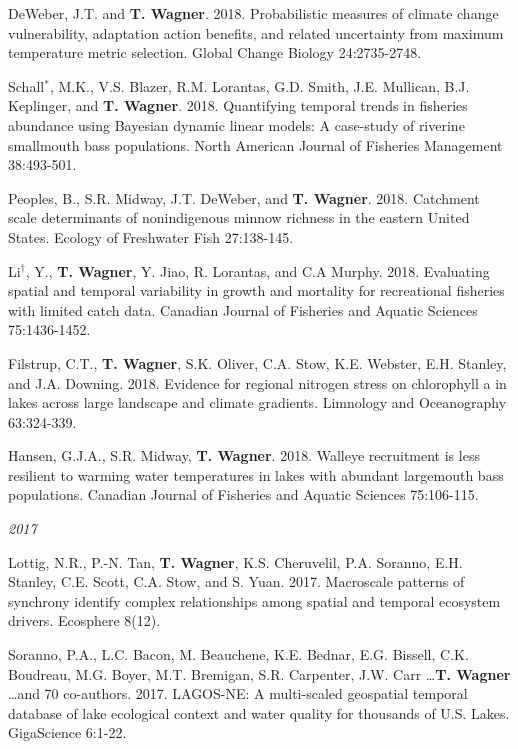 \documentclass[10pt]{article}
\begin{document}
\begin{flushleft}
\begin{etaremune}[start=81]
\item DeWeber, J.T. and {\bf T. Wagner}. 2018. Probabilistic measures of climate change vulnerability, adaptation action benefits, and related uncertainty from maximum temperature metric selection. Global Change Biology 24:2735-2748.

\item Schall$^*$, M.K., V.S. Blazer, R.M. Lorantas, G.D. Smith, J.E. Mullican, B.J. Keplinger, and {\bf T. Wagner}. 2018. Quantifying temporal trends in fisheries abundance using Bayesian dynamic linear models: A case-study of riverine smallmouth bass populations. North American Journal of Fisheries Management 38:493-501.

\item Peoples, B., S.R. Midway, J.T. DeWeber, and {\bf T. Wagner}. 2018. Catchment scale determinants of nonindigenous minnow richness in the eastern United States. Ecology of Freshwater Fish 27:138-145.

\item Li$^\dagger$, Y., {\bf T. Wagner}, Y. Jiao, R. Lorantas, and C.A Murphy. 2018. Evaluating spatial and temporal variability in growth and mortality for recreational fisheries with limited catch data. Canadian Journal of Fisheries and Aquatic Sciences 75:1436-1452.

\item Filstrup, C.T., {\bf T. Wagner}, S.K. Oliver, C.A. Stow, K.E. Webster, E.H. Stanley, and J.A. Downing. 2018. Evidence for regional nitrogen stress on chlorophyll a in lakes across large landscape and climate gradients. Limnology and Oceanography 63:324-339.

\item Hansen, G.J.A., S.R. Midway, {\bf T. Wagner}. 2018. Walleye recruitment is less resilient to warming water temperatures in lakes with abundant largemouth bass populations. Canadian Journal of Fisheries and Aquatic Sciences 75:106-115.

\end{etaremune}
\emph{2017}
\begin{etaremune}[start=68]

\item Lottig, N.R., P.-N. Tan, {\bf T. Wagner}, K.S. Cheruvelil, P.A. Soranno, E.H. Stanley, C.E. Scott, C.A. Stow, and S. Yuan. 2017. Macroscale patterns of synchrony identify complex relationships among spatial and temporal ecosystem drivers. Ecosphere 8(12).

\item Soranno, P.A., L.C. Bacon, M. Beauchene, K.E. Bednar, E.G. Bissell, C.K. Boudreau, M.G. Boyer, M.T. Bremigan, S.R. Carpenter, J.W. Carr \ldots  {\bf T. Wagner} \ldots  and 70 co-authors. 2017. LAGOS-NE: A multi-scaled geospatial temporal database of lake ecological context and water quality for thousands of U.S. Lakes. GigaScience 6:1-22.


\end{etaremune}
\end{flushleft}
\end{document}
